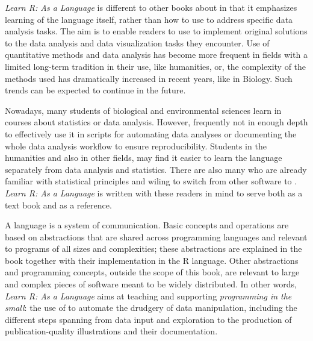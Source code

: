 \documentclass[krantz2]{krantz}\usepackage{knitr}
\begin{document}
\emph{Learn R: As a Language} is different to other books about \Rlang in that it emphasizes learning of the language itself, rather than how to use \Rlang to address specific data analysis tasks. The aim is to enable readers to use \Rlang to implement original solutions to the data analysis and data visualization tasks they encounter. Use of quantitative methods and data analysis has become more frequent in fields with a limited long-term tradition in their use, like humanities, or, the complexity of the methods used has dramatically increased in recent years, like in Biology. Such trends can be expected to continue in the future.

Nowadays, many students of biological and environmental sciences learn \Rlang in courses about statistics or data analysis. However, frequently not in enough depth to effectively use it in scripts for automating data analyses or documenting the whole data analysis workflow to ensure reproducibility. Students in the humanities and also in other fields, may find it easier to learn the \Rlang language separately from data analysis and statistics. There are also many who are already familiar with statistical principles and wiling to switch from other software to \Rlang. \emph{Learn R: As a Language} is written with these readers in mind to serve both as a text book and as a reference.

A language is a system of communication. Basic concepts and operations are based on abstractions that are shared across programming languages and relevant to programs of all sizes and complexities; these abstractions are explained in the book together with their implementation in the R language. Other abstractions and programming concepts, outside the scope of this book, are relevant to large and complex pieces of software meant to be widely distributed. In other words, \emph{Learn R: As a Language} aims at teaching and supporting \emph{programming in the small}: the use of \Rlang to automate the drudgery of data manipulation, including the different steps spanning from data input and exploration to the production of publication-quality illustrations and their documentation.
\end{document}
